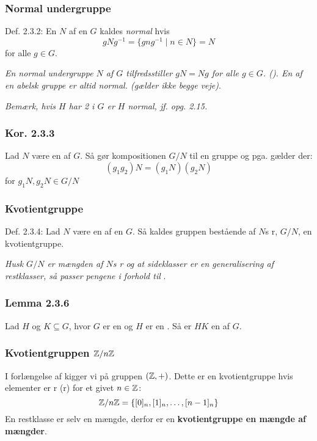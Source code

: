 \subsubsection{Normal undergruppe}
\label{Normal undergruppe}
Def. 2.3.2: En  $N$ af en  $G$ kaldes
\textit{normal} hvis
\begin{equation*}
  gNg^{-1} = \{gng^{-1} \mid n \in N\} = N
\end{equation*}
for alle $g \in G$.

\textit{En normal undergruppe $N$ af $G$ tilfredsstiller $gN = Ng$ for
alle $g \in G$. (). En  af en abelsk gruppe
er altid normal. (gælder ikke begge veje)}.

\textit{Bemærk, hvis $H$ har  2 i $G$ er $H$ normal, jf.
opg. 2.15.}

\subsubsection{Kor. 2.3.3}
Lad $N$ være en  af  $G$. Så gør
kompositionen  $G/N$ til en gruppe og pga.
 gælder der:
\begin{equation*}
  (g_1 g_2) N = (g_1 N)(g_2 N) 
\end{equation*}
for $g_1 N, g_2 N \in G/N$

\subsubsection{Kvotientgruppe}
\label{Kvotientgruppe}
Def. 2.3.4: Lad $N$ være en  af en 
$G$. Så kaldes gruppen bestående af $N$s r, $G/N$, en
kvotientgruppe.

\textit{Husk $G/N$ er mængden af $N$s r og at sideklasser er
en generalisering af restklasser, så passer pengene i forhold til
}.

\subsubsection{Lemma 2.3.6}
Lad $H$ og $K \subseteq G$, hvor $G$ er en  og $H$ er en
. Så er $HK$ en  af $G$.

\subsubsection{Kvotientgruppen $\mathbb{Z}/n\mathbb{Z}$}
\label{Kvotientgruppe_Z}
I forlængelse af  kigger vi på gruppen $(\mathbb{Z}, +)$. Dette
er en kvotientgruppe hvis elementer er r
(r) for et givet $n \in \mathbb{Z}$:
\begin{equation*}
  \mathbb{Z}/n\mathbb{Z} = \{ [0]_n,[1]_n,\ldots,[n-1]_n \}
\end{equation*}
En restklasse er selv en mængde, derfor er en \textbf{kvotientgruppe en mængde
af mængder}.

